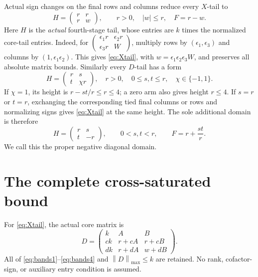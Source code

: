 \documentclass[11pt,reqno]{amsart}
\theoremstyle{definition}
\theoremstyle{remark}
\newcommand{\mx}[1]{\left\|#1\right\|_{\max}}
\begin{document}
Actual sign changes on the final rows and columns reduce every
\(X\)-tail to
\begin{equation}\label{eq:Xtail}
H=\begin{pmatrix}r&r\\r&w\end{pmatrix},
\qquad r>0,\quad |w|\le r,\quad F=r-w.
\end{equation}
Here \(H\) is the \emph{actual} fourth-stage tail, whose entries are
\(k\) times the normalized core-tail entries.
Indeed, for
\((\begin{smallmatrix}\epsilon_1r&\epsilon_2r\\
\epsilon_3r&W\end{smallmatrix})\),
multiply rows by \((\epsilon_1,\epsilon_3)\) and columns by
\((1,\epsilon_1\epsilon_2)\). This gives \eqref{eq:Xtail}, with
\(w=\epsilon_1\epsilon_2\epsilon_3W\), and preserves all absolute
matrix bounds.
Similarly every \(D\)-tail has a form
\begin{equation}\label{eq:Dtail}
H=\begin{pmatrix}r&s\\t&\chi r\end{pmatrix},
\quad r>0,\quad0\le s,t\le r,\quad\chi\in\{-1,1\}.
\end{equation}
If \(\chi=1\), its height is \(r-st/r\le r\le4\); a zero arm
also gives height \(r\le4\).
If \(s=r\) or \(t=r\), exchanging the corresponding tied final
columns or rows and normalizing signs gives \eqref{eq:Xtail} at the
same height. The sole additional domain is therefore
\begin{equation}\label{eq:properB}
H=\begin{pmatrix}r&s\\t&-r\end{pmatrix},
\qquad0<s,t<r,\qquad F=r+\frac{st}{r}.
\end{equation}
We call this the proper negative diagonal domain.

\section{The complete cross-saturated bound}\label{sec:X}

For \eqref{eq:Xtail}, the actual core matrix is
\begin{equation}\label{eq:XD}
D=\begin{pmatrix}
k&A&B\\
ck&r+cA&r+cB\\
dk&r+dA&w+dB
\end{pmatrix}.
\end{equation}
All of \eqref{eq:bands1}--\eqref{eq:bands4} and \(\mx D\le k\) are
retained. No rank, cofactor-sign, or auxiliary entry condition is assumed.
\end{document}
